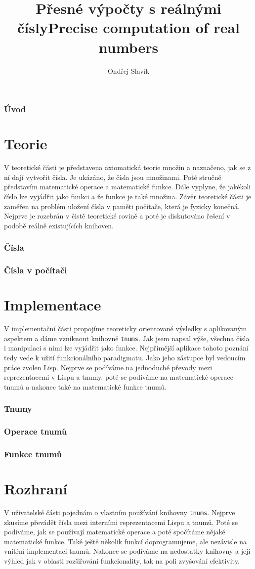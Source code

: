 \documentclass[
master=false,
field=inf,
encoding=utf8,
language=czech,
printversion=false,]{kidiplom}
\title{Přesné výpočty s reálnými čísly}
\title[english]{Precise computation of real numbers}
\author{Ondřej Slavík}
\newcommand{\mypart}{\newpage\part}
\begin{document}
\setcounter{tocdepth}{3}
\maketitle
\section{Úvod}

\mypart{Teorie}
V teoretické části je představena axiomatická teorie množin a naznačeno, jak se z ní dají vytvořit čísla. Je ukázáno, že čísla jsou množinami. Poté stručně představím matematické operace a matematické funkce. Dále vyplyne, že jakékoli číslo lze vyjádřit jako funkci a že funkce je také množina. Závěr teoretické části je zaměřen na problém uložení čísla v paměti počítače, která je fyzicky konečná. Nejprve je rozebrán v čistě teoretické rovině a poté je diskutováno řešení v podobě reálně existujících knihoven.
\section{Čísla}\label{kap:cisla}
	
\clearpage
\section{Čísla v počítači}

\mypart{Implementace}
V implementační části propojíme teoreticky orientované výsledky s aplikovaným aspektem a dáme vzniknout knihovně \texttt{tnums}. Jak jsem napsal výše, všechna čísla i manipulaci s nimi lze vyjádřit jako funkce. Nejpřímější aplikace tohoto poznání tedy vede k užití funkcionálního paradigmatu. Jako jeho zástupce byl vedoucím práce zvolen Lisp. Nejprve se podíváme na jednoduché převody mezi reprezentacemi v Lispu a tnumy, poté se podíváme na matematické operace tnumů a nakonec také na matematické funkce tnumů.
\section{Tnumy}

\clearpage
\section{Operace tnumů}

\clearpage
\section{Funkce tnumů}

\mypart{Rozhraní}
V uživatelské části pojednám o vlastním používání knihovny \texttt{tnums}. Nejprve zkusíme převádět čísla mezi interními reprezentacemi Lispu a tnumů. Poté se podíváme, jak se používají matematické operace a poté spočítáme nějaké matematické funkce. Také ještě několik funkcí doprogramujeme, ale nezávisle na vnitřní implementaci tnumů. Nakonec se podíváme na nedostatky knihovny a její výhled jak v oblasti rozšiřování funkcionality, tak na poli zvyšování efektivity.
\end{document}
